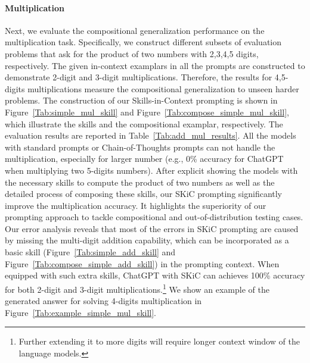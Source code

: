 \documentclass{article} \usepackage{arxiv}
\begin{document}
\paragraph{Multiplication} 
Next, we evaluate the compositional generalization performance on the multiplication task. Specifically, we construct different subsets of evaluation problems that ask for the product of two numbers with 2,3,4,5 digits, respectively. The given in-context examplars in all the prompts are constructed to demonstrate 2-digit and 3-digit multiplications. Therefore, the results for 4,5-digits multiplications measure the compositional generalization to unseen harder problems.
The construction of our Skills-in-Context prompting is shown in Figure~\ref{Tab:simple_mul_skill} and Figure~\ref{Tab:compose_simple_mul_skill}, which illustrate the skills and the compositional examplar, respectively. The evaluation results are reported in Table~\ref{Tab:add_mul_results}. All the models with standard prompts or Chain-of-Thoughts prompts can not handle the multiplication, especially for larger number (e.g., 0\% accuracy for ChatGPT when multiplying two 5-digits numbers). After explicit showing the models with the necessary skills to compute the product of two numbers as well as the detailed process of composing these skills, our SKiC prompting significantly improve the multiplication accuracy. It highlights the superiority of our prompting approach to tackle compositional and out-of-distribution testing cases. Our error analysis reveals that most of the errors in SKiC prompting are caused by missing the multi-digit addition capability, which can be incorporated as a basic skill (Figure~\ref{Tab:simple_add_skill} and Figure~\ref{Tab:compose_simple_add_skill}) in the prompting context. When equipped with such extra skills, ChatGPT with SKiC can achieves 100\% accuracy for both 2-digit and 3-digit multiplications.\footnote{Further extending it to more digits will require longer context window of the language models.} We show an example of the generated answer for solving 4-digits multiplication in Figure~\ref{Tab:example_simple_mul_skill}.
\end{document}
